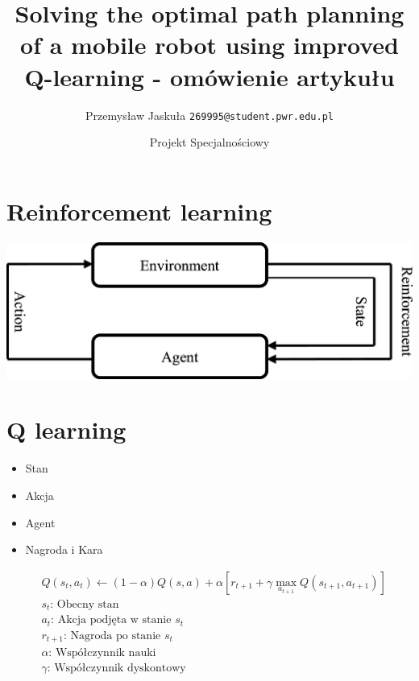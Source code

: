 \documentclass[aspectratio=169,15pt,]{beamer}
\title{Solving the optimal path planning of a mobile robot using improved Q-learning - omówienie artykułu}
\institute{WYDZIAŁ ELEKTRONIKI, FOTONIKI I MIKROSYSTEMÓW}
\date{Projekt Specjalnościowy}
\author[Euclid]{Przemysław Jaskuła \texttt{269995@student.pwr.edu.pl}}
\begin{document}
\begin{frame}[plain]
\titlepage
\end{frame}
\begin{frame}
\tableofcontents
\end{frame}
\section{Reinforcement learning}
\begin{frame}
	\sectionpage

\end{frame}
\begin{frame}
\centering
	\includegraphics[width =\textwidth]{Obrazy/RL.jpg}
\end{frame}
\section{Q learning}
\begin{frame}
	\sectionpage

\end{frame}
\begin{frame}
\begin{itemize}
 \item<1-> \Huge{Stan}
 \item<2->\Huge{Akcja}
 \item<3-> \Huge{Agent}
 \item<4-> \Huge{Nagroda i Kara}
\end{itemize}
\end{frame}
\begin{frame}
	\centering
	\begin{align*}
	&Q(s_t,a_t) \leftarrow (1-\alpha)Q(s,a)+\alpha \left[ r_{t+1} +\gamma \max_{a_{t+1}} Q(s_{t+1},a_{t+1})\right ] \\
	&s_t  \text{: Obecny stan}\\
	&a_t \text{: Akcja podjęta w stanie }s_t\\
	&r_{t+1} \text{: Nagroda po stanie }s_t\\
	&\alpha \text{: Współczynnik nauki}\\
	& \gamma \text{: Współczynnik dyskontowy}
	\end{align*}


\end{frame}
\end{document}
